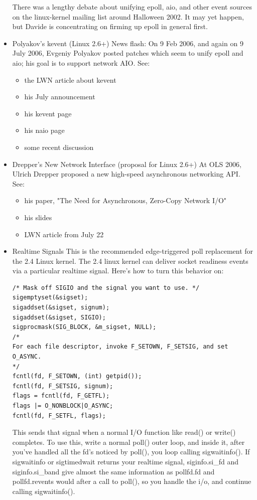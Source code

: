 \documentclass[twoside, xetex]{report}
\begin{document}
\begin{itemize}
There was a lengthy debate about unifying epoll, aio, and other event sources on the linux-kernel mailing list around Halloween 2002. It may yet happen, but Davide is concentrating on firming up epoll in general first.

\item Polyakov's kevent (Linux 2.6+) News flash: On 9 Feb 2006, and again on 9 July 2006, Evgeniy Polyakov posted patches which seem to unify epoll and aio; his goal is to support network AIO. See:

\begin{itemize}
\item the LWN article about kevent
\item his July announcement
\item his kevent page
\item his naio page
\item some recent discussion
\end{itemize}

\item Drepper's New Network Interface (proposal for Linux 2.6+)
At OLS 2006, Ulrich Drepper proposed a new high-speed asynchronous networking API. See:

\begin{itemize}
\item his paper, "The Need for Asynchronous, Zero-Copy Network I/O"
\item his slides
\item LWN article from July 22
\end{itemize}

\item Realtime Signals
This is the recommended edge-triggered poll replacement for the 2.4 Linux kernel.
The 2.4 linux kernel can deliver socket readiness events via a particular realtime signal. Here's how to turn this behavior on:

\begin{verbatim}
/* Mask off SIGIO and the signal you want to use. */
sigemptyset(&sigset);
sigaddset(&sigset, signum);
sigaddset(&sigset, SIGIO);
sigprocmask(SIG_BLOCK, &m_sigset, NULL);
/* 
For each file descriptor, invoke F_SETOWN, F_SETSIG, and set O_ASYNC. 
*/
fcntl(fd, F_SETOWN, (int) getpid());
fcntl(fd, F_SETSIG, signum);
flags = fcntl(fd, F_GETFL);
flags |= O_NONBLOCK|O_ASYNC;
fcntl(fd, F_SETFL, flags);
\end{verbatim}

This sends that signal when a normal I/O function like read() or write() completes. To use this, write a normal poll() outer loop, and inside it, after you've handled all the fd's noticed by poll(), you loop calling sigwaitinfo().
If sigwaitinfo or sigtimedwait returns your realtime signal, siginfo.si\_fd and siginfo.si\_band give almost the same information as pollfd.fd and pollfd.revents would after a call to poll(), so you handle the i/o, and continue calling sigwaitinfo().


\end{itemize}
\end{document}
